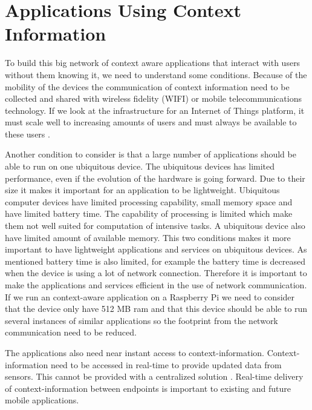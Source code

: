 \section{Applications Using Context Information}
To build this big network of context aware applications that interact with users without them knowing it, we need to understand some conditions. Because of the mobility of the devices the communication of context information need to be collected and shared with wireless fidelity (WIFI) or mobile telecommunications technology. If we look at the infrastructure for an Internet of Things platform, it must scale well to increasing amounts of users and must always be available to these users \cite{Kanter539187}.

Another condition to consider is that a large number of applications should be able to run on one ubiquitous device. The ubiquitous devices has limited performance, even if the evolution of the hardware is going forward. Due to their size it makes it important for an application to be lightweight. Ubiquitous computer devices have limited processing capability, small memory space and have limited battery time. The capability of processing is limited which make them not well suited for computation of intensive tasks. A ubiquitous device also have limited amount of available memory. This two conditions makes it more important to have lightweight applications and services on ubiquitous devices. As mentioned battery time is also limited, for example the battery time is decreased when the device is using a lot of network connection. Therefore it is important to make the applications and services efficient in the use of network communication. 
If we run an context-aware application on a Raspberry Pi we need to consider that the device only have 512 MB ram and that this device should be able to run several instances of similar applications so the footprint from the network communication need to be reduced. 

The applications also need near instant access to context-information. Context-information need to be accessed in real-time to provide updated data from sensors. This cannot be provided with a centralized solution \cite{TheMediaSenseFramework}. Real-time delivery of context-information between endpoints is important to existing and future mobile applications. 

